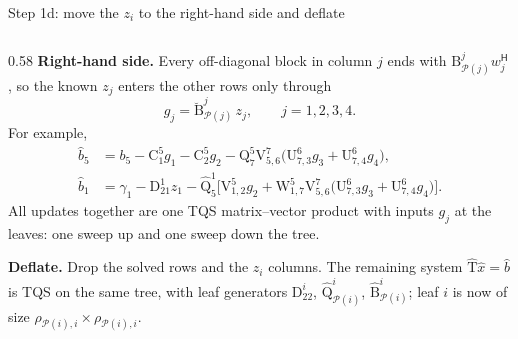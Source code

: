 \documentclass[aspectratio=169,11pt]{beamer}
\newcommand{\ct}{^{\mathsf H}}            %
\begin{document}
\begin{frame}{Step 1d: move the $z_i$ to the right-hand side and deflate}
\begin{columns}[c]
\begin{column}{0.58\textwidth}
\footnotesize
\textbf{Right-hand side.} Every off-diagonal block in column $j$ ends with
$\mathrm{B}^j_{\mathcal{P}(j)}w_j\ct$, so the known $z_j$ enters the other rows only through
\[
g_j=\breve{\mathrm{B}}^j_{\mathcal{P}(j)}\,z_j,\qquad j=1,2,3,4.
\]
For example,
\begin{align*}
\hat{b}_5&=b_5-\mathrm{C}^5_1g_1-\mathrm{C}^5_2g_2-\mathrm{Q}^5_7\mathrm{V}^7_{5,6}\bigl(\mathrm{U}^6_{7,3}g_3+\mathrm{U}^6_{7,4}g_4\bigr),\\
\hat{b}_1&=\gamma_1-\mathrm{D}^1_{21}z_1-\hat{\mathrm{Q}}^1_5\bigl[\mathrm{V}^5_{1,2}g_2
  +\mathrm{W}^5_{1,7}\mathrm{V}^7_{5,6}\bigl(\mathrm{U}^6_{7,3}g_3+\mathrm{U}^6_{7,4}g_4\bigr)\bigr].
\end{align*}
All updates together are one TQS matrix--vector product with inputs $g_j$ at the leaves:
one sweep up and one sweep down the tree.

\vspace{1mm}
\textbf{Deflate.} Drop the solved rows and the $z_i$ columns. The remaining system
$\hat{\mathrm{T}}\hat{x}=\hat{b}$ is TQS on the same tree, with leaf generators
$\mathrm{D}^i_{22}$, $\hat{\mathrm{Q}}^i_{\mathcal{P}(i)}$, $\hat{\mathrm{B}}^i_{\mathcal{P}(i)}$;
leaf $i$ is now of size $\rho_{\mathcal{P}(i),i}\times\rho_{\mathcal{P}(i),i}$.
\end{column}
\end{columns}
\end{frame}
\end{document}
